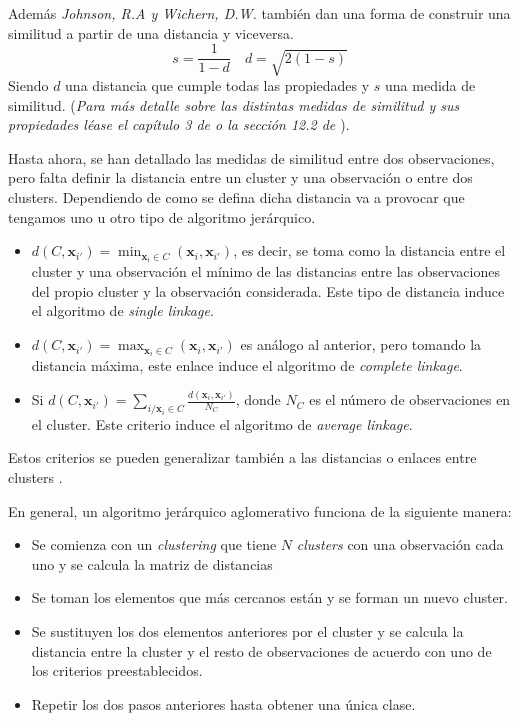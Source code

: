 \noindent Además \emph{Johnson, R.A y Wichern, D.W. }\cite{Johnson 2007} también dan una forma de construir una similitud a partir de una distancia y viceversa.
\begin{equation}
s=\dfrac{1}{1-d}\quad d=\sqrt{2(1-s)}
\end{equation}
\noindent Siendo $d$ una distancia que cumple todas las propiedades y $s$ una medida de similitud. (\emph{Para más detalle sobre las distintas medidas de similitud y sus propiedades léase el capítulo 3 de \cite{Everitt 2011} o la sección 12.2 de \cite{Johnson 2007}}).

\noindent Hasta ahora, se han detallado las medidas de similitud entre dos observaciones, pero falta definir la distancia entre un cluster y una observación o entre dos clusters. Dependiendo de como se defina dicha distancia va a provocar que tengamos uno u otro tipo de algoritmo jerárquico.\cite{Everitt 2011, Johnson 2007, Peña 2002}
\begin{itemize}
\item $d(C,\mathbf{x}_{i'})=\min_{\mathbf{x}_i\in C}(\mathbf{x}_i,\mathbf{x}_{i'})$, es decir, se toma como la distancia entre el cluster y una observación el mínimo de las distancias entre las observaciones del propio cluster y la observación considerada. Este tipo de distancia induce el algoritmo de \emph{single linkage}. 
\item  $d(C,\mathbf{x}_{i'})=\max_{\mathbf{x}_i\in C}(\mathbf{x}_i,\mathbf{x}_{i'})$ es análogo al anterior, pero tomando la distancia máxima, este enlace induce el algoritmo de  \textit{complete linkage}.
\item  Si $d(C,\mathbf{x}_{i'})=\sum_{i/\mathbf{x}_i\in C}\frac{d(\mathbf{x}_i,\mathbf{x}_{i'})}{N_C}$, donde $N_C$ es el número de observaciones en el cluster. Este criterio induce el algoritmo de \emph{average linkage}.
\end{itemize}

\noindent Estos criterios se pueden generalizar también a las distancias o enlaces entre clusters \cite{Scitovski 2021}. 

\noindent En general, un algoritmo jerárquico aglomerativo funciona de la siguiente manera:

\begin{itemize}
\item Se comienza con un \emph{clustering} que tiene $N$ \emph{clusters} con una observación cada uno y se calcula la matriz de distancias
\item Se toman los elementos que más cercanos están y se forman un nuevo cluster.
\item Se sustituyen los dos elementos anteriores por el cluster y se calcula la distancia entre la cluster y el resto de observaciones de acuerdo con uno de los criterios preestablecidos. 
\item Repetir los dos pasos anteriores hasta obtener una única clase. 
\end{itemize}


